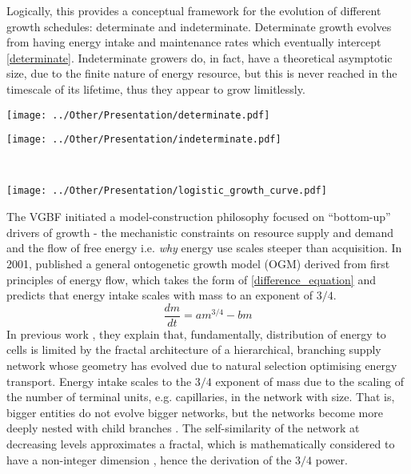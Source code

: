 \documentclass[a4paper]{article} %
\begin{document}
        Logically, this provides a conceptual framework for the evolution of different growth schedules: determinate and indeterminate. Determinate growth evolves from having energy intake and maintenance rates which eventually intercept \ref{determinate}. Indeterminate growers do, in fact, have a theoretical asymptotic size, due to the finite nature of energy resource, but this is never reached in the timescale of its lifetime, thus they appear to grow limitlessly.
    
        \begin{center}
            \begin{minipage}{0.33\linewidth}
            \texttt{[image: ../Other/Presentation/determinate.pdf]}
            \label{determinate}
            \end{minipage}%
            \begin{minipage}{0.33\linewidth}
            \texttt{[image: ../Other/Presentation/indeterminate.pdf]}  
            \label{indeterminate}
            \end{minipage}\\
            \begin{minipage}{0.7\linewidth}
                \texttt{[image: ../Other/Presentation/logistic\_growth\_curve.pdf]}  
                \label{logistic_growth}
                \end{minipage}
        \end{center}
        The VGBF initiated a model-construction philosophy focused on ``bottom-up'' drivers of growth - the mechanistic constraints on resource supply and demand and the flow of free energy i.e. \textit{why} energy use scales steeper than acquisition. In 2001, \cite{West2001} published a general ontogenetic growth model (OGM) derived from first principles of energy flow, which takes the form of \eqref{difference_equation} and predicts that energy intake scales with mass to an exponent of $3/4$.  
        \begin{equation}
            \frac{dm}{dt} = am^{3/4} - bm \label{west_ogm}
        \end{equation}
        In previous work \autocite{West1997}, they explain that, fundamentally, distribution of energy to cells is limited by the fractal architecture of a hierarchical, branching supply network whose geometry has evolved due to natural selection optimising energy transport. Energy intake scales to the $3/4$ exponent of mass due to the scaling of the number of terminal units, e.g. capillaries, in the network with size. That is, bigger entities do not evolve bigger networks, but the networks become more deeply nested with child branches \autocite{West1997}. The self-similarity of the network at decreasing levels approximates a fractal, which is mathematically considered to have a non-integer dimension \autocite{Hausdorff1918, Mandelbrot1982}, hence the derivation of the $3/4$ power. 
        
\end{document}
